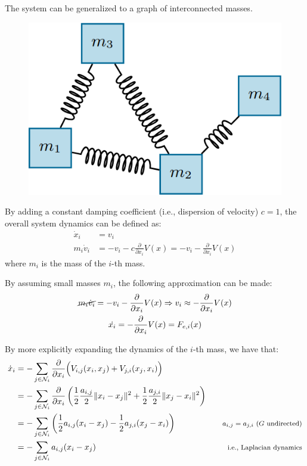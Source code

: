 \begin{description}
        \begin{remark}
            The system can be generalized to a graph of interconnected masses.

            \begin{figure}[H]
                \centering
                \includegraphics[width=0.3\linewidth]{./img/mass_spring_system3.png}
            \end{figure}
        \end{remark}
        
        By adding a constant damping coefficient (i.e., dispersion of velocity) $c=1$, the overall system dynamics can be defined as:
        \[
            \begin{split}
                \dot{x}_i &= v_i \\
                m_i \dot{v}_i &= - v_i - c\frac{\partial}{\partial x_i} V(x) = - v_i - \frac{\partial}{\partial x_i} V(x)
            \end{split}
        \]
        where $m_i$ is the mass of the $i$-th mass.

        By assuming small masses $m_i$, the following approximation can be made:
        \[
            \begin{gathered}
                \cancel{m_i \dot{v}_i} = - v_i - \frac{\partial}{\partial x_i} V(x) \Rightarrow v_i \approx -\frac{\partial}{\partial x_i} V(x) \\
                \dot{x_i} = -\frac{\partial}{\partial x_i} V(x) = F_{e,i}(x)
            \end{gathered}
        \]

        By more explicitly expanding the dynamics of the $i$-th mass, we have that:
        \[
            \begin{aligned}
                \dot{x}_i
                &= - \sum_{j \in \mathcal{N}_i} \frac{\partial}{\partial x_i} \Big( V_{i,j}(x_i, x_j) + V_{j,i}(x_j, x_i) \Big) \\
                &= - \sum_{j \in \mathcal{N}_i} \frac{\partial}{\partial x_i} \left( \frac{1}{2} \frac{a_{i,j}}{2} \Vert x_i - x_j \Vert^2 + \frac{1}{2} \frac{a_{j,i}}{2} \Vert x_j - x_i \Vert^2 \right) \\
                &= - \sum_{j \in \mathcal{N}_i} \left( \frac{1}{2} a_{i,j} (x_i - x_j) - \frac{1}{2} a_{j,i} (x_j - x_i) \right) &&& \text{\footnotesize $a_{i,j}=a_{j,i}$ ($G$ undirected)} \\
                &= - \sum_{j \in \mathcal{N}_i} a_{i,j} (x_i - x_j) &&& \text{\footnotesize i.e., Laplacian dynamics}
            \end{aligned}
        \]
        

\end{description}
